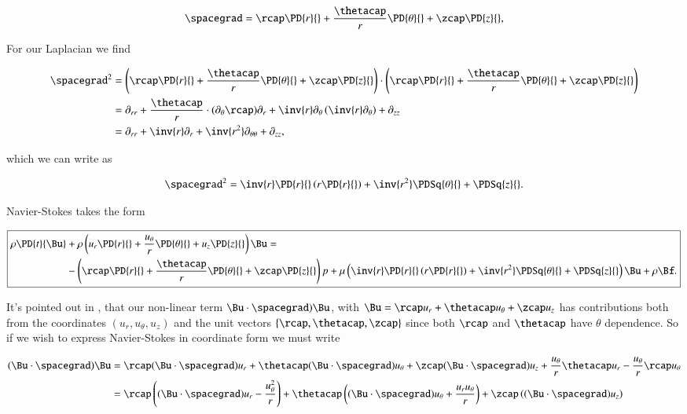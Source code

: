 \begin{equation}\label{eqn:classicalMechanicsPs2:610}
\spacegrad =
\rcap \PD{r}{} +
\frac{\thetacap}{r} \PD{\theta}{} +
\zcap \PD{z}{},
\end{equation}

For our Laplacian we find

\begin{align*}
\spacegrad^2 &=
\left(
\rcap \PD{r}{} +
\frac{\thetacap}{r} \PD{\theta}{} +
\zcap \PD{z}{}
\right)
 \cdot
\left(
\rcap \PD{r}{} +
\frac{\thetacap}{r} \PD{\theta}{} +
\zcap \PD{z}{}
\right) \\
&=
\partial_{rr}
+ \frac{\thetacap}{r} \cdot (\partial_\theta \rcap) \partial_r
+ \inv{r} \partial_\theta \left( \inv{r} \partial_\theta \right)
+ \partial_{zz} \\
&=
\partial_{rr} + \inv{r} \partial_r + \inv{r^2} \partial_{\theta\theta} + \partial_{zz},
\end{align*}

which we can write as

\begin{equation}\label{eqn:continuumL12:630}
\spacegrad^2 = \inv{r} \PD{r}{} \left( r \PD{r}{} \right) + \inv{r^2} \PDSq{\theta}{} + \PDSq{z}{}.
\end{equation}

Navier-Stokes takes the form

\begin{equation}\label{eqn:classicalMechanicsPs2:650}
\boxed{
\begin{aligned}
\rho \PD{t}{\Bu} &+ \rho
\left(
u_r \PD{r}{} +
\frac{u_\theta}{r} \PD{\theta}{} +
u_z \PD{z}{} \right) \Bu
=  \\
&-
\left(
\rcap \PD{r}{} +
\frac{\thetacap}{r} \PD{\theta}{} +
\zcap \PD{z}{}
\right)
p + \mu \left(
\inv{r} \PD{r}{} \left( r \PD{r}{} \right) + \inv{r^2} \PDSq{\theta}{} + \PDSq{z}{} \right)
\Bu + \rho \Bf.
\end{aligned}
}
\end{equation}

It's pointed out in \cite{acheson1990elementary}, that our non-linear term $\Bu \cdot \spacegrad) \Bu$, with $\Bu = \rcap u_r + \thetacap u_\theta + \zcap u_z$ has contributions both from the coordinates $(u_r, u_\theta, u_z)$ and the unit vectors $\{\rcap, \thetacap, \zcap\}$ since both $\rcap$ and $\thetacap$ have $\theta$ dependence.  So if we wish to express Navier-Stokes in coordinate form we must write

\begin{equation}\label{eqn:classicalMechanicsPs2:650b}
\begin{aligned}
(\Bu \cdot \spacegrad) \Bu
&=
\rcap (\Bu \cdot \spacegrad) u_r 
+\thetacap (\Bu \cdot \spacegrad) u_\theta
+\zcap (\Bu \cdot \spacegrad) u_z
+ \frac{u_\theta}{r} \thetacap u_r
- \frac{u_\theta}{r} \rcap u_\theta \\
&=
\rcap \left((\Bu \cdot \spacegrad) u_r 
- \frac{u_\theta^2}{r} 
\right)
+\thetacap \left((\Bu \cdot \spacegrad) u_\theta
+ \frac{u_r u_\theta}{r} 
\right)
+\zcap \left((\Bu \cdot \spacegrad) u_z\right)
\end{aligned}
\end{equation}

